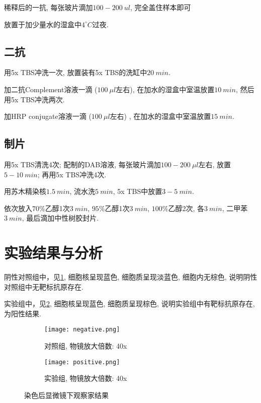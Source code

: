 \documentclass{article}
\begin{document}
稀释后的一抗, 每张玻片滴加$100-200\ ul$, 完全盖住样本即可

放置于加少量水的湿盒中$4^{\circ} C$过夜.

\subsection{二抗}

用5x TBS冲洗一次, 放置装有5x TBS的洗缸中$20\ min$.

加二抗Complement溶液一滴 ($100\ \mu l$左右), 在加水的湿盒中室温放置$10\ min$, 然后用5x TBS冲洗两次.

加HRP conjugate溶液一滴 ($100\ \mu l$左右) , 在加水的湿盒中室温放置$15\ min$.

\subsection{制片}

用5x TBS清洗4次; 配制的DAB溶液, 每张玻片滴加$100-200\ \mu l$左右, 放置$5-10\ min$; 再用5x TBS冲洗4次.

用苏木精染核$1.5\ min$, 流水洗$5\ min$, 5x TBS中放置$3-5\ min$.

依次放入$70\%$乙醇1次$3\ min$, $95\%$乙醇1次$3\ min$, $100\%$乙醇2次, 各$3\ min$, 二甲苯$3\ min$, 最后滴加中性树胶封片.

\section{实验结果与分析}

阴性对照组中，见\ref{fig:sub1}, 细胞核呈现蓝色, 细胞质呈现淡蓝色, 细胞内无棕色, 说明阴性对照组中无靶标抗原存在.

实验组中，见\ref{fig:sub2}, 细胞核呈现蓝色, 细胞质呈现棕色, 说明实验组中有靶标抗原存在, 为阳性结果.

\begin{figure}[htbp]
    \centering
    \begin{subfigure}[b]{0.45\textwidth}
        \texttt{[image: negative.png]}
        \caption{对照组, 物镜放大倍数: 40x}
        \label{fig:sub1}
    \end{subfigure}
    \hfill
    \begin{subfigure}[b]{0.45\textwidth}
        \texttt{[image: positive.png]}
        \caption{实验组, 物镜放大倍数: 40x}
        \label{fig:sub2}
    \end{subfigure}
    \caption{染色后显微镜下观察家结果}
    \label{fig:group}
\end{figure}
\end{document}
